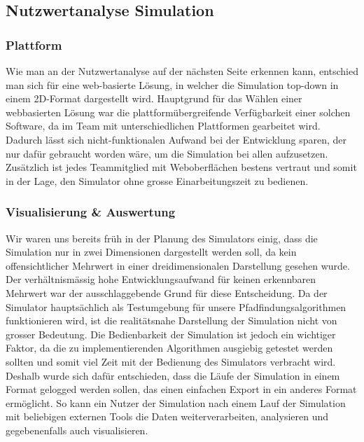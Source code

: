 \documentclass[main.tex]{subfiles} %
\begin{document}

\subsection{Nutzwertanalyse Simulation}

\subsubsection{Plattform}
Wie man an der Nutzwertanalyse auf der nächsten Seite erkennen kann, entschied man
sich für eine web-basierte Lösung, in welcher die Simulation top-down in einem 2D-Format dargestellt wird.
Hauptgrund für das Wählen einer webbasierten Lösung war die plattformübergreifende Verfügbarkeit einer
solchen Software, da im Team mit unterschiedlichen Plattformen gearbeitet wird. Dadurch lässt sich
nicht-funktionalen Aufwand bei der Entwicklung sparen, der nur dafür gebraucht worden wäre, um die Simulation
bei allen aufzusetzen. Zusätzlich ist jedes Teammitglied mit Weboberflächen bestens vertraut und somit in
der Lage, den Simulator ohne grosse Einarbeitungszeit zu bedienen.

\subsubsection{Visualisierung \& Auswertung}
Wir waren uns bereits früh in der Planung des Simulators einig, dass
die Simulation nur in zwei Dimensionen dargestellt werden soll, da kein offensichtlicher Mehrwert in einer
dreidimensionalen Darstellung gesehen wurde. Der verhältnismässig hohe Entwicklungsaufwand für keinen erkennbaren
Mehrwert war der ausschlaggebende Grund für diese Entscheidung. Da der Simulator hauptsächlich als
Testumgebung für unsere Pfadfindungsalgorithmen funktionieren wird, ist die realitätsnahe Darstellung der Simulation
nicht von grosser Bedeutung. Die Bedienbarkeit der Simulation ist jedoch ein wichtiger Faktor, da
die zu implementierenden Algorithmen ausgiebig getestet werden sollten und somit viel Zeit mit der Bedienung des Simulators verbracht wird.
Deshalb wurde sich dafür entschieden, dass die Läufe der Simulation in einem Format gelogged werden sollen, das einen
einfachen Export in ein anderes Format ermöglicht. So kann ein Nutzer der Simulation nach einem Lauf der Simulation mit
beliebigen externen Tools die Daten weiterverarbeiten, analysieren und gegebenenfalls auch visualisieren.
\end{document}
